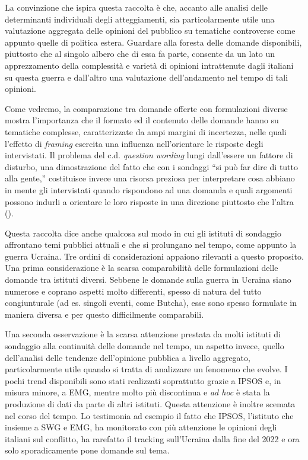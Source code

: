 \documentclass[
]{book}
\begin{document}
La convinzione che ispira questa raccolta è che, accanto alle analisi delle determinanti individuali degli atteggiamenti, sia particolarmente utile una valutazione aggregata delle opinioni del pubblico su tematiche controverse come appunto quelle di politica estera. Guardare alla foresta delle domande disponibili, piuttosto che al singolo albero che di essa fa parte, consente da un lato un apprezzamento della complessità e varietà di opinioni intrattenute dagli italiani su questa guerra e dall'altro una valutazione dell'andamento nel tempo di tali opinioni.

Come vedremo, la comparazione tra domande offerte con formulazioni diverse mostra l'importanza che il formato ed il contenuto delle domande hanno su tematiche complesse, caratterizzate da ampi margini di incertezza, nelle quali l'effetto di \emph{framing} esercita una influenza nell'orientare le risposte degli intervistati. Il problema del c.d. \emph{question wording} lungi dall'essere un fattore di disturbo, una dimostrazione del fatto che con i sondaggi ``si può far dire di tutto alla gente,'' costituisce invece una risorsa preziosa per interpretare cosa abbiano in mente gli intervistati quando rispondono ad una domanda e quali argomenti possono indurli a orientare le loro risposte in una direzione piuttosto che l'altra (\citet{Sudman-Bradburn1974}).

Questa raccolta dice anche qualcosa sul modo in cui gli istituti di sondaggio affrontano temi pubblici attuali e che si prolungano nel tempo, come appunto la guerra Ucraina. Tre ordini di considerazioni appaiono rilevanti a questo proposito. Una prima considerazione è la scarsa comparabilità delle formulazioni delle domande tra istituti diversi. Sebbene le domande sulla guerra in Ucraina siano numerose e coprano aspetti molto differenti, spesso di natura del tutto congiunturale (ad es. singoli eventi, come Butcha), esse sono spesso formulate in maniera diversa e per questo difficilmente comparabili.

Una seconda osservazione è la scarsa attenzione prestata da molti istituti di sondaggio alla continuità delle domande nel tempo, un aspetto invece, quello dell'analisi delle tendenze dell'opinione pubblica a livello aggregato, particolarmente utile quando si tratta di analizzare un fenomeno che evolve. I pochi trend disponibili sono stati realizzati soprattutto grazie a IPSOS e, in misura minore, a EMG, mentre molto più discontinua e \emph{ad hoc} è stata la produzione di dati da parte di altri istituti. Questa attenzione è inoltre scemata nel corso del tempo. Lo testimonia ad esempio il fatto che IPSOS, l'istituto che insieme a SWG e EMG, ha monitorato con più attenzione le opinioni degli italiani sul conflitto, ha rarefatto il tracking sull'Ucraina dalla fine del 2022 e ora solo sporadicamente pone domande sul tema.
\end{document}
